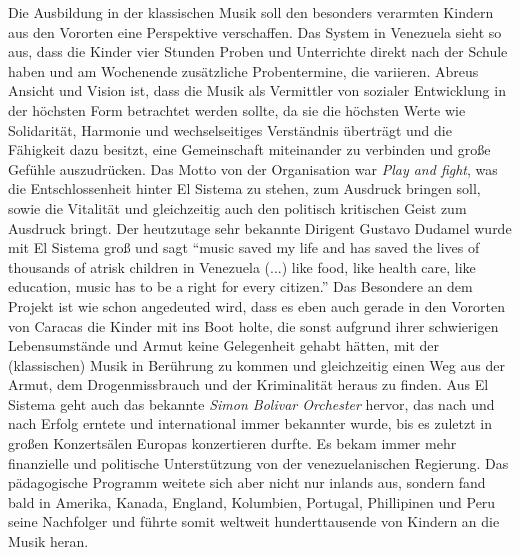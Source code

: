 Die Ausbildung in der klassischen Musik soll den besonders verarmten Kindern aus
den Vororten eine Perspektive verschaffen. Das System in Venezuela sieht so aus,
dass die Kinder vier Stunden Proben und Unterrichte direkt nach der Schule haben
und am Wochenende zusätzliche Probentermine, die variieren. Abreus Ansicht und
Vision ist, dass die Musik als Vermittler von sozialer Entwicklung in der
höchsten Form betrachtet werden sollte, da sie die höchsten Werte wie
Solidarität, Harmonie und wechselseitiges Verständnis überträgt und die
Fähigkeit dazu besitzt, eine Gemeinschaft miteinander zu verbinden und große
Gefühle auszudrücken. Das Motto von der Organisation war \emph{Play and fight},
was die Entschlossenheit hinter El Sistema zu stehen, zum Ausdruck bringen soll,
sowie die Vitalität und gleichzeitig auch den politisch kritischen Geist zum
Ausdruck bringt. Der heutzutage sehr bekannte Dirigent Gustavo Dudamel wurde mit
El Sistema groß und sagt \enquote{music saved my life and has saved the lives of
thousands of atrisk children in Venezuela (...) like food, like health care,
like education, music has to be a right for every
citizen.}\autocite{wikipedia:el_sistema} Das Besondere an dem Projekt ist wie
schon angedeuted wird, dass es eben auch gerade in den Vororten von Caracas die
Kinder mit ins Boot holte, die sonst aufgrund ihrer schwierigen Lebensumstände
und Armut keine Gelegenheit gehabt hätten, mit der (klassischen) Musik in
Berührung zu kommen und gleichzeitig einen Weg aus der Armut, dem
Drogenmissbrauch und der Kriminalität heraus zu finden. Aus El Sistema geht auch
das bekannte \emph{Simon Bolivar Orchester} hervor, das nach und nach Erfolg
erntete und international immer bekannter wurde, bis es zuletzt in großen
Konzertsälen Europas konzertieren durfte. Es bekam immer mehr finanzielle und
politische Unterstützung von der venezuelanischen Regierung. Das pädagogische
Programm weitete sich aber nicht nur inlands aus, sondern fand bald in Amerika,
Kanada, England, Kolumbien, Portugal, Phillipinen und Peru seine Nachfolger und
führte somit weltweit hunderttausende von Kindern an die Musik heran. 

